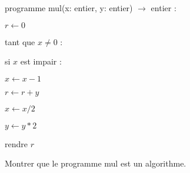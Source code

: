 \begin{framed}
\ttfamily
programme mul(x: entier, y: entier) $\to$ entier :

\quad $r \gets 0$

\quad tant que $x \neq 0$ :

\quad\quad si $x$ est impair :

\quad\quad\quad $x \gets x - 1$

\quad\quad\quad $r \gets r + y$

\quad\quad $x \gets x / 2$

\quad\quad $y \gets y * 2$

\quad rendre $r$
\end{framed}

Montrer que le programme mul est un algorithme.
